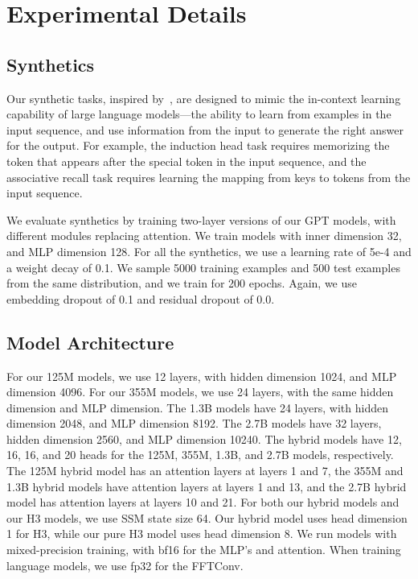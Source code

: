\documentclass{article}
\newcommand{\hthree}{\textsc{H3}\xspace}
\begin{document}
 \section{Experimental Details \label{sec:app_exp_details}}

\subsection{Synthetics}
Our synthetic tasks, inspired by~\citep{olsson2022context}, are designed to mimic the in-context learning capability of large language models---the ability to learn from examples in the input sequence, and use information from the input to generate the right answer for the output.
For example, the induction head task requires memorizing the token that appears after the special  token in the input sequence, and the associative recall task requires learning the mapping from keys to tokens from the input sequence.

We evaluate synthetics by training two-layer versions of our GPT models, with different modules replacing attention.
We train models with inner dimension 32, and MLP dimension 128.
For all the synthetics, we use a learning rate of 5e-4 and a weight decay of 0.1.
We sample 5000 training examples and 500 test examples from the same distribution, and we train for 200 epochs.
Again, we use embedding dropout of 0.1 and residual dropout of 0.0.

\subsection{Model Architecture}
For our 125M models, we use 12 layers, with hidden dimension 1024, and MLP dimension 4096.
For our 355M models, we use 24 layers, with the same hidden dimension and MLP dimension.
The 1.3B models have 24 layers, with hidden dimension 2048, and MLP dimension 8192.
The 2.7B models have 32 layers, hidden dimension 2560, and MLP dimension 10240.
The hybrid models have 12, 16, 16, and 20 heads for the 125M, 355M, 1.3B, and 2.7B models, respectively.
The 125M hybrid model has an attention layers at layers 1 and 7, the 355M and 1.3B hybrid models have attention layers at layers 1 and 13, and the 2.7B hybrid model has attention layers at layers 10 and 21.
For both our hybrid models and our \hthree models, we use SSM state size 64.
Our hybrid model uses head dimension 1 for \hthree, while our pure \hthree model uses head dimension 8.
We run models with mixed-precision training, with bf16 for the MLP's and attention.
When training language models, we use fp32 for the FFTConv.
\end{document}
